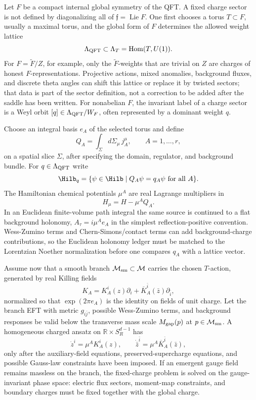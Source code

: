 Let \(F\) be a compact internal global symmetry of the QFT.  A fixed charge
sector is not defined by diagonalizing all of \(\mathfrak f=\operatorname{Lie}F\).
One first chooses a torus \(T\subset F\), usually a maximal torus, and the
global form of \(F\) determines the allowed weight lattice
\[
  \Lambda_{\rm QFT}\subset \Lambda_T=\operatorname{Hom}(T,U(1)).
\]
For \(F=\widetilde F/Z\), for example, only the \(\widetilde F\)-weights
that are trivial on \(Z\) are charges of honest \(F\)-representations.
Projective actions, mixed anomalies, background fluxes, and discrete theta
angles can shift this lattice or replace it by twisted sectors; that data is
part of the sector definition, not a correction to be added after the saddle
has been written.  For nonabelian \(F\), the invariant label of a charge
sector is a Weyl orbit \([q]\in\Lambda_{\rm QFT}/W_F\), often represented by
a dominant weight \(q\).

Choose an integral basis \(e_A\) of the selected torus and define
\[
  Q_A=\int_{\Sigma} d\Sigma_\mu\, j_A^\mu ,
  \qquad A=1,\ldots,r ,
\]
on a spatial slice \(\Sigma\), after specifying the domain, regulator, and
background bundle.  For \(q\in\Lambda_{\rm QFT}\) write
\[
  \Hilb_q=\{\psi\in\Hilb\mid Q_A\psi=q_A\psi\ \text{for all }A\}.
\]
The Hamiltonian chemical potentials \(\mu^A\) are real Lagrange multipliers
in
\[
  H_\mu=H-\mu^A Q_A .
\]
In an Euclidean finite-volume path integral the same source is continued to
a flat background holonomy, \(A_\tau=i\mu^A e_A\) in the simplest
reflection-positive convention.  Wess-Zumino terms and Chern-Simons/contact
terms can add background-charge contributions, so the Euclidean holonomy
ledger must be matched to the Lorentzian Noether normalization before one
compares \(q_A\) with a lattice vector.

Assume now that a smooth branch \(\mathcal M_{\rm sm}\subset\mathcal M\)
carries the chosen \(T\)-action, generated by real Killing fields
\[
  K_A=K_A^i(z)\partial_i+\overline{K}_A^{\bar i}(\bar z)\partial_{\bar i},
\]
normalized so that \(\exp(2\pi e_A)\) is the identity on fields of unit
charge.  Let the branch EFT with metric \(g_{i\bar j}\), possible
Wess-Zumino terms, and background responses be valid below the transverse
mass scale \(M_{\rm gap}(p)\) at \(p\in\mathcal M_{\rm sm}\).  A homogeneous
charged ansatz on \(\mathbb R\times S_R^{d-1}\) has
\[
  \dot z^i=\mu^A K_A^i(z),\qquad
  \dot{\bar z}^{\bar i}=\mu^A\overline{K}_A^{\bar i}(\bar z),
\]
only after the auxiliary-field equations, preserved-supercharge equations,
and possible Gauss-law constraints have been imposed.  If an emergent gauge
field remains massless on the branch, the fixed-charge problem is solved on
the gauge-invariant phase space: electric flux sectors, moment-map
constraints, and boundary charges must be fixed together with the global
charge.

